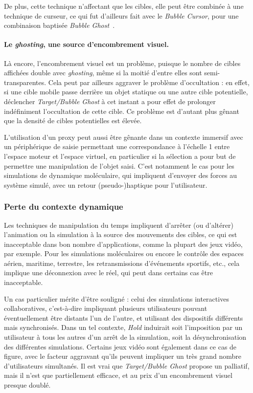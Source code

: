 	De plus, cette technique n'affectant que les cibles, elle peut être combinée à une technique de curseur, ce qui fut d'ailleurs fait avec le \emph{Bubble Cursor}, pour une combinaison baptisée \emph{Bubble Ghost}~\cite{hasan2011comet}.
	
	\paragraph{Le \emph{ghosting}, une source d'encombrement visuel.}
	Là encore, l'encombrement visuel est un problème, puisque le nombre de cibles affichées double avec \emph{ghosting}, même si la moitié d'entre elles sont semi-transparentes. Cela peut par ailleurs aggraver le problème d'occultation : en effet, si une cible mobile passe derrière un objet statique ou une autre cible potentielle, déclencher \emph{Target/Bubble Ghost} à cet instant a pour effet de prolonger indéfiniment l'occultation de cette cible. Ce problème est d'autant plus gênant que la densité de cibles potentielles est élevée.
		
	L'utilisation d'un proxy peut aussi être gênante dans un contexte immersif avec un périphérique de saisie permettant une correspondance à l'échelle 1 entre l'espace moteur et l'espace virtuel, en particulier si la sélection a pour but de permettre une manipulation de l'objet saisi. C'est notamment le cas pour les simulations de dynamique moléculaire, qui impliquent d'envoyer des forces au système simulé, avec un retour (pseudo-)haptique pour l'utilisateur.
		
	\subsubsection{Perte du contexte dynamique}
	Les techniques de manipulation du temps impliquent d'arrêter (ou d'altérer) l'animation ou la simulation à la source des mouvements des cibles, ce qui est inacceptable dans bon nombre d'applications, comme la plupart des jeux vidéo, par exemple. Pour les simulations moléculaires ou encore le contrôle des espaces aérien, maritime, terrestre, les retransmissions d'événements sportifs, etc., cela implique une déconnexion avec le réel, qui peut dans certains cas être inacceptable.
	
	Un cas particulier mérite d'être souligné : celui des simulations interactives collaboratives, c'est-à-dire impliquant plusieurs utilisateurs pouvant éventuellement être distants l'un de l'autre, et utilisant des dispositifs différents mais synchronisés. Dans un tel contexte, \emph{Hold} induirait soit l'imposition par un utilisateur à tous les autres d'un arrêt de la simulation, soit la désynchronisation des différentes simulations. Certains jeux vidéo sont également dans ce cas de figure, avec le facteur aggravant qu'ils peuvent impliquer un très grand nombre d'utilisateurs simultanés. Il est vrai que \emph{Target/Bubble Ghost} propose un palliatif, mais il n'est que partiellement efficace, et au prix d'un encombrement visuel presque doublé.
	

